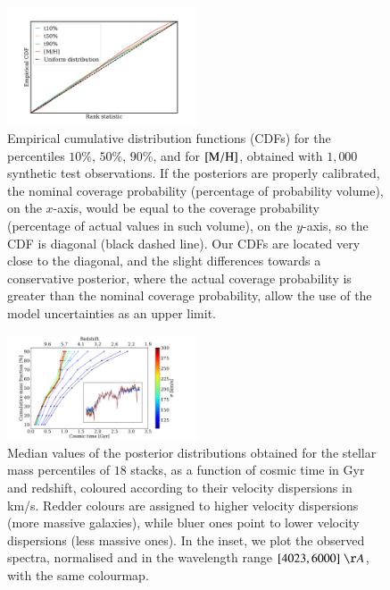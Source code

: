\begin{figure}[h!]
    \centering
    
    \includegraphics[width=0.5\textwidth]{images/sbc/ecdf.pdf}
    
    \caption{Empirical cumulative distribution functions (CDFs) for the percentiles $10\%$, $50\%$, $90\%$, and for $\rm{[M/H]}$, obtained with $1{,}000$ synthetic test observations.  If the posteriors are properly calibrated, the nominal coverage probability (percentage of probability volume), on the $x$-axis, would be equal to the coverage probability (percentage of actual values in such volume), on the $y$-axis, so the CDF is diagonal (black dashed line). Our CDFs are located very close to the diagonal, and the slight differences towards a conservative posterior, where the actual coverage probability is greater than the nominal coverage probability, allow the use of the model uncertainties as an upper limit. }

    \label{ecdf}
\end{figure}

\begin{figure}[h!]
    \centering
    \includegraphics[width=0.5\textwidth]{images/obs/pred_gal_full.pdf}
    \caption{Median values of the posterior distributions obtained for the stellar mass percentiles of $18$ stacks, as a function of cosmic time in Gyr and redshift, coloured according to their velocity dispersions in km/s.  Redder colours are assigned to higher velocity dispersions (more massive galaxies), while bluer ones point to lower velocity dispersions (less massive ones). In the inset, we plot the observed spectra, normalised and in the wavelength range $[4023, 6000] \; \AA$, with the same colourmap.}
    \label{percentiles_obs_full}
\end{figure}



